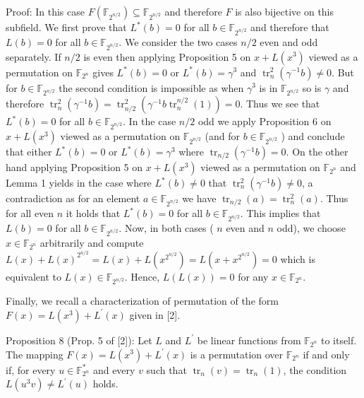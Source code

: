 \documentclass[10pt]{article}
\begin{document}
Proof: In this case $F\left(\mathbb{F}_{2^{n / 2}}\right) \subseteq \mathbb{F}_{2^{n / 2}}$ and therefore $F$ is also bijective on this subfield. We first prove that $L^{*}(b)=0$ for all $b \in \mathbb{F}_{2^{n / 2}}$ and therefore that $L(b)=0$ for all $b \in \mathbb{F}_{2^{n / 2}}$. We consider the two cases $n / 2$ even and odd separately. If $n / 2$ is even then applying Proposition 5 on $x+L\left(x^{3}\right)$ viewed as a permutation on $\mathbb{F}_{2^{n}}$ gives $L^{*}(b)=0$ or $L^{*}(b)=\gamma^{3}$ and $\operatorname{tr}_{n}^{2}\left(\gamma^{-1} b\right) \neq 0$. But for $b \in \mathbb{F}_{2^{n / 2}}$ the second condition is impossible as when $\gamma^{3}$ is in $\mathbb{F}_{2^{n / 2}}$ so is $\gamma$ and therefore $\operatorname{tr}_{n}^{2}\left(\gamma^{-1} b\right)=\operatorname{tr}_{n / 2}^{2}\left(\gamma^{-1} b \operatorname{tr}_{n}^{n / 2}(1)\right)=0$. Thus we see that $L^{*}(b)=0$ for all $b \in \mathbb{F}_{2^{n / 2}}$. In the case $n / 2$ odd we apply Proposition 6 on $x+L\left(x^{3}\right)$ viewed as a permutation on $\mathbb{F}_{2^{n / 2}}$ (and for $b \in \mathbb{F}_{2^{n / 2}}$ ) and conclude that either $L^{*}(b)=0$ or $L^{*}(b)=\gamma^{3}$ where $\operatorname{tr}_{n / 2}\left(\gamma^{-1} b\right)=0$. On the other hand applying Proposition 5 on $x+L\left(x^{3}\right)$ viewed as a permutation on $\mathbb{F}_{2^{n}}$ and Lemma 1 yields in the case where $L^{*}(b) \neq 0$ that $\operatorname{tr}_{n}^{2}\left(\gamma^{-1} b\right) \neq 0$, a contradiction as for an element $a \in \mathbb{F}_{2^{n / 2}}$ we have $\operatorname{tr}_{n / 2}(a)=\operatorname{tr}_{n}^{2}(a)$. Thus for all even $n$ it holds that $L^{*}(b)=0$ for all $b \in \mathbb{F}_{2^{n / 2}}$. This implies that $L(b)=0$ for all $b \in \mathbb{F}_{2^{n / 2}}$. Now, in both cases ( $n$ even and $n$ odd), we choose $x \in \mathbb{F}_{2^{n}}$ arbitrarily and compute $L(x)+L(x)^{2^{n / 2}}=L(x)+L\left(x^{2^{n / 2}}\right)=L\left(x+x^{2^{n / 2}}\right)=0$ which is equivalent to $L(x) \in \mathbb{F}_{2^{n / 2}}$. Hence, $L(L(x))=0$ for any $x \in \mathbb{F}_{2^{n}}$.

Finally, we recall a characterization of permutation of the form $F(x)=L\left(x^{3}\right)+L^{\prime}(x)$ given in [2].

Proposition 8 (Prop. 5 of [2]): Let $L$ and $L^{\prime}$ be linear functions from $\mathbb{F}_{2^{n}}$ to itself. The mapping $F(x)=L\left(x^{3}\right)+ L^{\prime}(x)$ is a permutation over $\mathbb{F}_{2^{n}}$ if and only if, for every $u \in \mathbb{F}_{2^{n}}^{*}$ and every $v$ such that $\operatorname{tr}_{n}(v)=\operatorname{tr}_{n}(1)$, the condition $L\left(u^{3} v\right) \neq L^{\prime}(u)$ holds.
\end{document}
